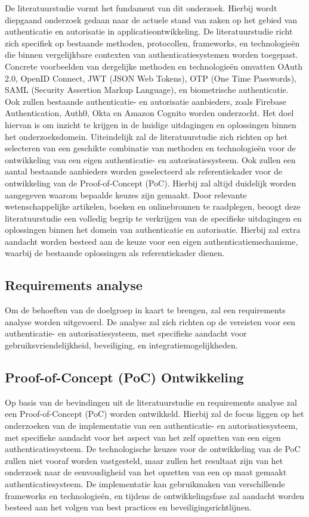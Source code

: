De literatuurstudie vormt het fundament van dit onderzoek. Hierbij wordt diepgaand onderzoek gedaan naar de actuele stand van zaken op het gebied 
van authenticatie en autorisatie in applicatieontwikkeling. De literatuurstudie richt zich specifiek op bestaande methoden, protocollen, frameworks, 
en technologieën die binnen vergelijkbare contexten van authenticatiesystemen worden toegepast. Concrete voorbeelden van dergelijke methoden en 
technologieën omvatten OAuth 2.0, OpenID Connect, JWT (JSON Web Tokens), OTP (One Time Passwords), SAML (Security Assertion Markup Language), en 
biometrische authenticatie. Ook zullen bestaande authenticatie- en autorisatie aanbieders, zoals Firebase Authentication, Auth0, Okta en Amazon Cognito
worden onderzocht. Het doel hiervan is om inzicht te krijgen in de huidige uitdagingen en oplossingen binnen het onderzoeksdomein.
Uiteindelijk zal de literatuurstudie zich richten op het selecteren van een geschikte combinatie van methoden en technologieën voor de ontwikkeling
van een eigen authenticatie- en autorisatiesysteem. Ook zullen een aantal bestaande aanbieders worden geselecteerd als referentiekader voor de
ontwikkeling van de Proof-of-Concept (PoC). Hierbij zal altijd duidelijk worden aangegeven waarom bepaalde keuzes zijn gemaakt.
Door relevante wetenschappelijke artikelen, boeken en onlinebronnen te raadplegen, beoogt deze literatuurstudie een volledig begrip te verkrijgen 
van de specifieke uitdagingen en oplossingen binnen het domein van authenticatie en autorisatie. Hierbij zal extra aandacht worden besteed aan de 
keuze voor een eigen authenticatiemechanisme, waarbij de bestaande oplossingen als referentiekader dienen.

\subsection{Requirements analyse}

Om de behoeften van de doelgroep in kaart te brengen, zal een requirements analyse worden uitgevoerd.
De analyse zal zich richten op de vereisten voor een authenticatie- en 
autorisatiesysteem, met specifieke aandacht voor gebruiksvriendelijkheid, beveiliging, en integratiemogelijkheden.

\subsection{Proof-of-Concept (PoC) Ontwikkeling}

Op basis van de bevindingen uit de literatuurstudie en requirements analyse zal een Proof-of-Concept (PoC) worden ontwikkeld. Hierbij zal de focus 
liggen op het onderzoeken van de implementatie van een authenticatie- en autorisatiesysteem, met specifieke aandacht voor het aspect van 
het zelf opzetten van een eigen authenticatiesysteem.
De technologische keuzes voor de ontwikkeling van de PoC zullen niet vooraf worden vastgesteld, maar zullen het resultaat zijn van het onderzoek 
naar de eenvoudigheid van het opzetten van een op maat gemaakt authenticatiesysteem. De implementatie kan gebruikmaken van verschillende frameworks 
en technologieën, en tijdens de ontwikkelingsfase zal aandacht worden besteed aan het volgen van best practices en beveiligingsrichtlijnen.

